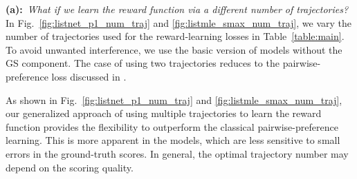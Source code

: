 \textbf{(a):}~\textit{What if we learn the reward function via a different number of trajectories?}
In Fig.~\ref{fig:listnet_p1_num_traj} and \ref{fig:listmle_smax_num_traj}, we vary the number of trajectories used for the reward-learning losses in Table~\ref{table:main}.
To avoid unwanted interference, we use the basic version of models without the GS component.
The case of using two trajectories reduces to the pairwise-preference loss discussed in .

As shown in Fig.~\ref{fig:listnet_p1_num_traj} and \ref{fig:listmle_smax_num_traj}, our generalized approach of using multiple trajectories to learn the reward function provides the flexibility to outperform the classical pairwise-preference learning.
This is more apparent in the \rewardmle models, which are less sensitive to small errors in the ground-truth scores. 
In general, the optimal trajectory number may depend on the scoring quality.

